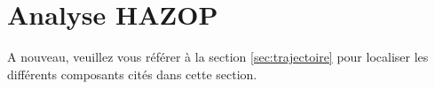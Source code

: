 \begin{figure}[htb!]
	\centering
	\label{pid2}
\end{figure}

\newpage
\section{Analyse HAZOP}
A nouveau, veuillez vous référer à la section \ref{sec:trajectoire}
pour localiser les différents composants cités dans cette section.

